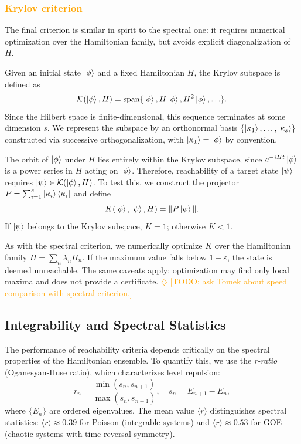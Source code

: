 \documentclass[aps,prx,reprint,superscriptaddress,footnote, twocolumn,notitlepage]{revtex4-2}
\newcommand{\ko}[1]{\textcolor{orange}{#1}}
\newcommand{\todoko}[1]{\ko{$\diamondsuit$ #1}}
\begin{document}
\subsubsection{\ko{Krylov criterion}}
The final criterion is similar in spirit to the spectral one: it requires numerical optimization over the Hamiltonian family, but avoids explicit diagonalization of $H$.

Given an initial state $\ket{\phi}$ and a fixed Hamiltonian $H$, the Krylov subspace is defined as
\begin{equation}
    \mathcal{K}(\ket{\phi}, H) = \mathrm{span}\{\ket{\phi}, H\ket{\phi}, H^2\ket{\phi}, \ldots\}.
\end{equation}
Since the Hilbert space is finite-dimensional, this sequence terminates at some dimension $s$. We represent the subspace by an orthonormal basis $\{\ket{\kappa_1}, \ldots, \ket{\kappa_s}\}$ constructed via successive orthogonalization, with $\ket{\kappa_1} = \ket{\phi}$ by convention.

The orbit of $\ket{\phi}$ under $H$ lies entirely within the Krylov subspace, since $e^{-iHt}\ket{\phi}$ is a power series in $H$ acting on $\ket{\phi}$. Therefore, reachability of a target state $\ket{\psi}$ requires $\ket{\psi} \in \mathcal{K}(\ket{\phi}, H)$. To test this, we construct the projector $P = \sum_{i=1}^{s} \ket{\kappa_i}\bra{\kappa_i}$ and define
\begin{equation}
    K(\ket{\phi}, \ket{\psi}, H) = \| P \ket{\psi} \|.
\end{equation}
If $\ket{\psi}$ belongs to the Krylov subspace, $K = 1$; otherwise $K < 1$.

As with the spectral criterion, we numerically optimize $K$ over the Hamiltonian family $H = \sum_n \lambda_n H_n$. If the maximum value falls below $1 - \varepsilon$, the state is deemed unreachable. The same caveats apply: optimization may find only local maxima and does not provide a certificate. \todoko{[TODO: ask Tomek about speed comparison with spectral criterion.]}

\subsection{Integrability and Spectral Statistics} \label{sec:integrability}

The performance of reachability criteria depends critically on the spectral properties of the Hamiltonian ensemble. To quantify this, we use the \emph{r-ratio} (Oganesyan-Huse ratio), which characterizes level repulsion:
\begin{equation}
    r_n = \frac{\min(s_n, s_{n+1})}{\max(s_n, s_{n+1})}, \quad s_n = E_{n+1} - E_n,
    \label{eq:r_ratio}
\end{equation}
where $\{E_n\}$ are ordered eigenvalues. The mean value $\langle r \rangle$ distinguishes spectral statistics: $\langle r \rangle \approx 0.39$ for Poisson (integrable systems) and $\langle r \rangle \approx 0.53$ for GOE (chaotic systems with time-reversal symmetry).
\end{document}
